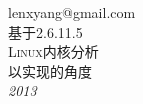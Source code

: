 \begin{titlepage}
\raggedleft
{\Large lenxyang@gmail.com\\[1in]}
{\large 基于2.6.11.5\\}
{\Huge\scshape Linux内核分析\\[.2in]}
{\large 以实现的角度\\}
\vfill
{\itshape 2013}
\end{titlepage}

